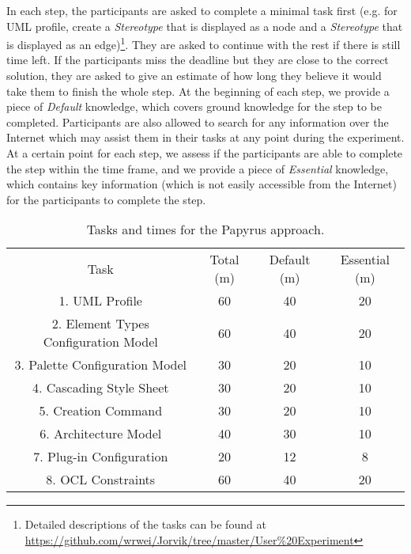 In each step, the participants are asked to complete a minimal task first (e.g. for UML profile, create a \textit{Stereotype} that is displayed as a node and a \textit{Stereotype} that is displayed as an edge)\footnote{Detailed descriptions of the tasks can be found at \url{https://github.com/wrwei/Jorvik/tree/master/User\%20Experiment}}. 
They are asked to continue with the rest if there is still time left. 
If the participants miss the deadline but they are close to the correct solution, they are asked to give an estimate of how long they believe it would take them to finish the whole step.
At the beginning of each step, we provide a piece of \textit{Default} knowledge, which covers ground knowledge for the step to be completed. 
Participants are also allowed to search for any information over the Internet which may assist them in their tasks at any point during the experiment.
At a certain point for each step, we assess if the participants are able to complete the step within the time frame, and we provide a piece of \textit{Essential} knowledge, which contains key information (which is not easily accessible from the Internet) for the participants to complete the step.

\begin{table}[ht!]
	\centering
	\setlength{\tabcolsep}{3.5pt} 
	\begin{tabular}{|c|c|c|c|}
		Task & Total (m) & Default (m) & Essential (m) \\ 
		1. UML Profile & 60 & 40 & 20 \\
		2. Element Types Configuration Model & 60 & 40 & 20 \\
		3. Palette Configuration Model & 30 & 20 & 10 \\
		4. Cascading Style Sheet & 30 & 20 & 10 \\
		5. Creation Command & 30 & 20 & 10 \\
		6. Architecture Model & 40 & 30 & 10 \\
		7. Plug-in Configuration & 20 & 12 & 8 \\
		8. OCL Constraints & 60 & 40 & 20 \\
	\end{tabular}
	\caption{Tasks and times for the Papyrus approach.}
	\label{tab:manual}
\end{table}


